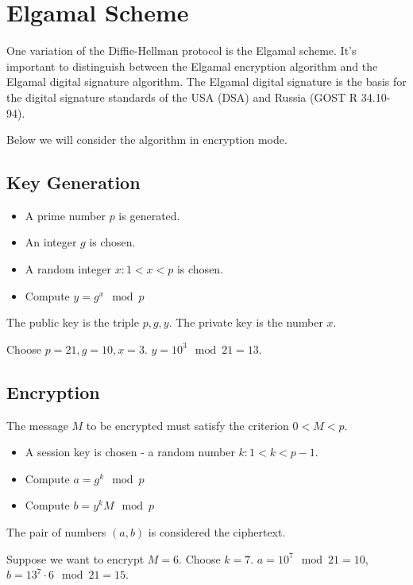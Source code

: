 \section{Elgamal Scheme}
\label{sec:add:dm:elgamal}
One variation of the Diffie-Hellman protocol is the Elgamal scheme. It's important to distinguish between the Elgamal encryption algorithm and the Elgamal digital signature algorithm. The Elgamal digital signature is the basis for the digital signature standards of the USA (DSA) and Russia (GOST R 34.10-94).

Below we will consider the algorithm in encryption mode.

\subsection{Key Generation}

\begin{itemize}
\item A prime number $p$ is generated.
\item An integer $g$ is chosen.
\item A random integer $x: 1 < x < p$ is chosen.
\item Compute $y = g^x \mod p$
\end{itemize}

The public key is the triple $p, g, y$. The private key is the number $x$.

\begin{example}
Choose $p = 21, g = 10, x = 3$. $y = 10^3 \mod 21 = 13$.
\label{ex:add:dm:elgamal_gen}
\end{example}

\subsection{Encryption}
The message $M$ to be encrypted must satisfy the criterion $0 < M < p$.
\begin{itemize}
\item A session key is chosen - a random number $k: 1 < k < p - 1$.
\item Compute $a = g^k \mod p$
\item Compute $b = y^k M \mod p$
\end{itemize}

The pair of numbers $(a, b)$ is considered the ciphertext.
\begin{example}
Suppose we want to encrypt $M=6$.
Choose $k = 7$. $a = 10^7 \mod 21 = 10$, $b = 13^7 \cdot 6 \mod 21 = 15$.
\label{ex:add:dm:elgamal_crypt}
\end{example}

